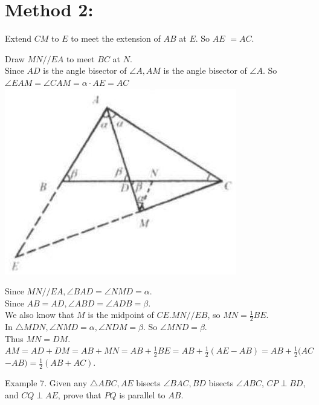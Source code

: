 \documentclass[10pt]{article}
\begin{document}
\section*{Method 2:}
Extend \(C M\) to \(E\) to meet the extension of \(A B\) at \(E\). So \(A E\) \(=A C\).

Draw \(M N / / E A\) to meet \(B C\) at \(N\).\\
Since \(A D\) is the angle bisector of \(\angle A, A M\) is the angle bisector of \(\angle A\). So \(\angle E A M=\angle C A M=\alpha \cdot A E=A C\)\\
\includegraphics[max width=\textwidth, center]{2025_04_17_97bc1f7e44d93c271a88g-058}

Since \(M N / / E A, \angle B A D=\angle N M D=\alpha\).\\
Since \(A B=A D, \angle A B D=\angle A D B=\beta\).\\
We also know that \(M\) is the midpoint of \(C E . M N / / E B\), so \(M N=\frac{1}{2} B E\).\\
In \(\triangle M D N, \angle N M D=\alpha, \angle N D M=\beta\). So \(\angle M N D=\beta\).\\
Thus \(M N=D M\).\\
\(A M=A D+D M=A B+M N=A B+\frac{1}{2} B E=A B+\frac{1}{2}(A E-A B)=A B+\frac{1}{2}(A C\) \(-A B)=\frac{1}{2}(A B+A C)\).

Example 7. Given any \(\triangle A B C, A E\) bisects \(\angle B A C, B D\) bisects \(\angle A B C\), \(C P \perp B D\), and \(C Q \perp A E\), prove that \(P Q\) is parallel to \(A B\).
\end{document}
